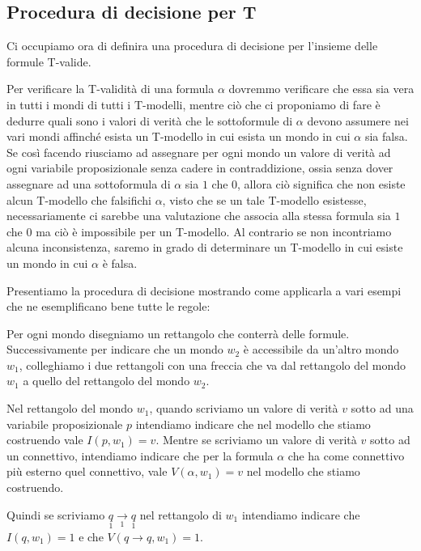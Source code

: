 \documentclass[a4paper, 12pt]{article}
\begin{document}
\subsection{Procedura di decisione per T}
Ci occupiamo ora di definira una procedura di decisione per l'insieme delle formule T-valide.

Per verificare la T-validità di una formula $\alpha$ dovremmo verificare che essa sia vera in tutti
i mondi di tutti i T-modelli, mentre ciò che ci proponiamo di fare è dedurre quali sono i valori di verità
che le sottoformule di $\alpha$ devono assumere nei vari mondi affinché esista un T-modello
in cui esista un mondo in cui $\alpha$ sia falsa.
Se così facendo riusciamo ad assegnare per ogni mondo un valore di verità ad ogni variabile proposizionale
senza cadere in contraddizione, ossia senza dover assegnare ad una sottoformula di $\alpha$ sia $1$ che $0$,
allora ciò significa che non esiste alcun T-modello che falsifichi $\alpha$, visto che se un tale T-modello
esistesse, necessariamente ci sarebbe una valutazione che associa
alla stessa formula sia $1$ che $0$ ma ciò è impossibile per un T-modello.
Al contrario se non incontriamo alcuna inconsistenza, saremo in grado
di determinare un T-modello in cui esiste un mondo in cui $\alpha$ è falsa.

Presentiamo la procedura di decisione mostrando come applicarla a vari esempi che ne
esemplificano bene tutte le regole:

Per ogni mondo disegniamo un rettangolo che conterrà delle formule.
Successivamente per indicare che un mondo $w_2$ è accessibile da un'altro mondo $w_1$,
colleghiamo i due rettangoli con una freccia che va dal rettangolo del mondo $w_1$
a quello del rettangolo del mondo $w_2$.

Nel rettangolo del mondo $w_1$, quando scriviamo un valore di verità $v$ sotto ad una
variabile proposizionale $p$ intendiamo indicare che nel modello che stiamo costruendo
vale $I(p, w_1) = v$.
Mentre se scriviamo un valore di verità $v$ sotto ad un connettivo, intendiamo indicare
che per la formula $\alpha$ che ha come connettivo più esterno quel connettivo,
vale $V(\alpha, w_1) = v$ nel modello che stiamo costruendo.

Quindi se scriviamo
$\underset{1}{q} \underset{1}{\rightarrow} \underset{1}{q}$ nel rettangolo di $w_1$
intendiamo indicare che $I(q, w_1) = 1$ e che $V(q \rightarrow q, w_1) = 1$.
\end{document}
